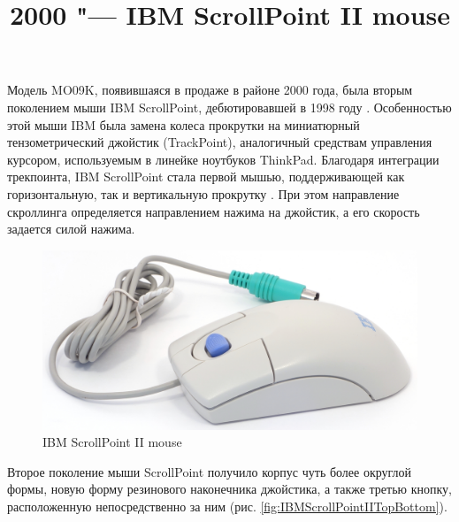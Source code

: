 \documentclass[11pt, a4paper]{article}
\begin{document}
\title{2000 "--- IBM ScrollPoint II mouse}
\date{}
\maketitle
{}
Модель MO09K, появившаяся в продаже в районе 2000 года, была вторым поколением мыши IBM ScrollPoint, дебютировавшей в 1998 году \cite{hist}. Особенностью этой мыши IBM была замена колеса прокрутки на миниатюрный тензометрический джойстик (TrackPoint), аналогичный средствам управления курсором, используемым в линейке ноутбуков ThinkPad. Благодаря интеграции трекпоинта, IBM ScrollPoint стала первой мышью, поддерживающей как горизонтальную, так и вертикальную прокрутку \cite{buxtonG1}. При этом направление скроллинга определяется направлением нажима на джойстик, а его скорость задается силой нажима.

\begin{figure}[h]
    \centering
    \includegraphics[scale=0.6]{2000_ibm_scrollpoint_ii_mouse/pic_30.jpg}
    \caption{IBM ScrollPoint II mouse}
    \label{fig:IBMScrollPointIIPic}
\end{figure}

Второе поколение мыши ScrollPoint получило корпус чуть более округлой формы, новую форму резинового наконечника джойстика, а также третью кнопку, расположенную непосредственно за ним (рис. \ref{fig:IBMScrollPointIITopBottom}).
\end{document}
